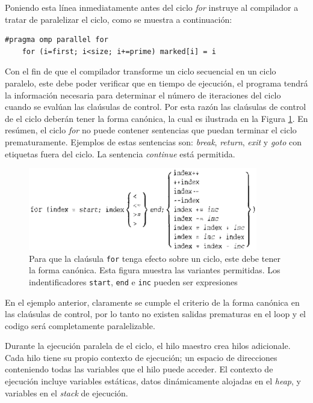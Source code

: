 \documentclass[12pt,letterpaper]{book}
\begin{document}
Poniendo esta línea inmediatamente antes del ciclo \textit{for} instruye al compilador a tratar de paralelizar el ciclo, como se muestra a continuación:

\begin{lstlisting}[style=C]
#pragma omp parallel for
	for (i=first; i<size; i+=prime) marked[i] = i
\end{lstlisting}

Con el fin de que el compilador transforme un ciclo secuencial en un ciclo paralelo, este debe poder verificar que en tiempo de ejecución, el programa tendrá la información necesaria para determinar el número de iteraciones del ciclo cuando se evalúan las claúsulas de control. Por esta razón las claúsulas de control de el ciclo deberán tener la forma canónica, la cual es ilustrada en la Figura \ref{fig:for_form}. En resúmen, el ciclo \textit{for} no puede contener sentencias que puedan terminar el ciclo prematuramente. Ejemplos de estas sentencias son: \textit{break}, \textit{return}, \textit{exit} y \textit{goto} con etiquetas fuera del ciclo. La sentencia \textit{continue} está permitida.

\begin{figure}
\begin{center}
\includegraphics[width=10cm]{../imagenes/for_form.png} 
\end{center}
\caption{Para que la claúsula \texttt{for} tenga efecto sobre un ciclo, este debe tener la forma canónica. Esta figura muestra las variantes permitidas. Los indentificadores \texttt{start}, \texttt{end} e \texttt{inc} pueden ser expresiones}
\label{fig:for_form}
\end{figure}

En el ejemplo anterior,  claramente se cumple el criterio de la forma canónica en las claúsulas de control, por lo tanto no existen salidas prematuras en el loop y el codigo será completamente paralelizable.

Durante la ejecución paralela de el ciclo, el hilo maestro crea hilos adicionale. Cada hilo tiene su propio contexto de ejecución; un espacio de direcciones conteniendo todas las variables que el hilo puede acceder. El contexto de ejecución incluye variables estáticas, datos dinámicamente alojadas en el \textit{heap}, y variables en el \textit{stack} de ejecución.
\end{document}
